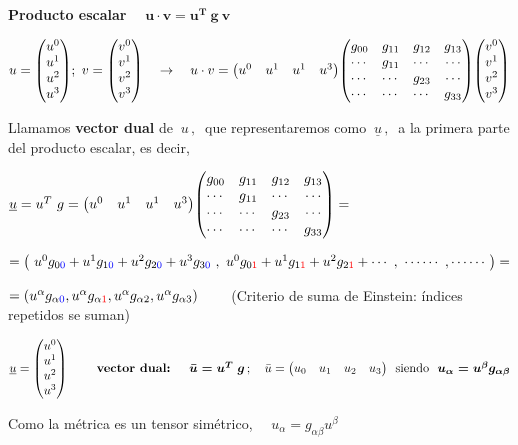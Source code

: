 \vspace{5mm} \textbf{Producto escalar} $\quad \boldsymbol{ u \cdot v = u^T \ g \ v}$


$u=\mqty(u^0\\u^1\\u^2\\u^3);\ v=\mqty(v^0\\v^1\\v^2\\v^3) \quad \to \quad
u\cdot v=\mqty(u^0&u^1&u^1&u^3) \mqty(g_{00}&g_{11}&g_{12}&g_{13}\\\cdots & g_{11} & \cdots & \cdots \\ \cdots & \cdots  & g_{23} & \cdots \\ \cdots &\cdots &\cdots & g_{33})  \mqty(v^0\\v^1\\v^2\\v^3)$

\vspace{10mm}

Llamamos \textbf{vector dual} de $\ u \, , \  $	que representaremos como $\ \underline u \, , \ $ a la primera parte del producto escalar, es decir, 

$\underline u = u^T\ g =
\mqty(u^0&u^1&u^1&u^3) \mqty(g_{00}&g_{11}&g_{12}&g_{13}\\\cdots & g_{11} & \cdots & \cdots \\ \cdots & \cdots  & g_{23} & \cdots \\ \cdots &\cdots &\cdots & g_{33})=$

$=\left( \ u^0g_{0\textcolor{blue}{0}}+u^1g_{1\textcolor{blue}{0}}+u^2g_{2\textcolor{blue}{0}}+u^3g_{3\textcolor{blue}{0}} \ , \ u^0g_{0\textcolor{red}{1}}+u^1g_{1\textcolor{red}{1}}+u^2g_{2\textcolor{red}{1}} + \cdots \ , \ \cdots \cdots  \ , \cdots \cdots  \ \right) =$

$=\left( u^\alpha g_{\alpha \textcolor{blue}{0}} , u^\alpha g_{\alpha \textcolor{red}{1}} , u^\alpha g_{\alpha 2}, u^\alpha g_{\alpha 3} \right)\qquad$
(Criterio de suma de Einstein: índices repetidos se suman)

\begin{definition}

$\underline u = 
\mqty(u^0\\u^1\\u^2\\u^3) \qquad \textbf{ vector dual: } \quad 
\boldsymbol{
 \bar u = u^T \ g 
 }
 \, ; 
\quad \bar u = \mqty(u_0&u_1&u_2&u_3)\ \text{ siendo } \
\boldsymbol{u_\alpha = u^\beta g_{\alpha \beta} 
 }$ 

\vspace{3mm}Como la métrica es un tensor simétrico, $\quad u_\alpha=g_{\alpha \beta} u^\beta$
\end{definition}

